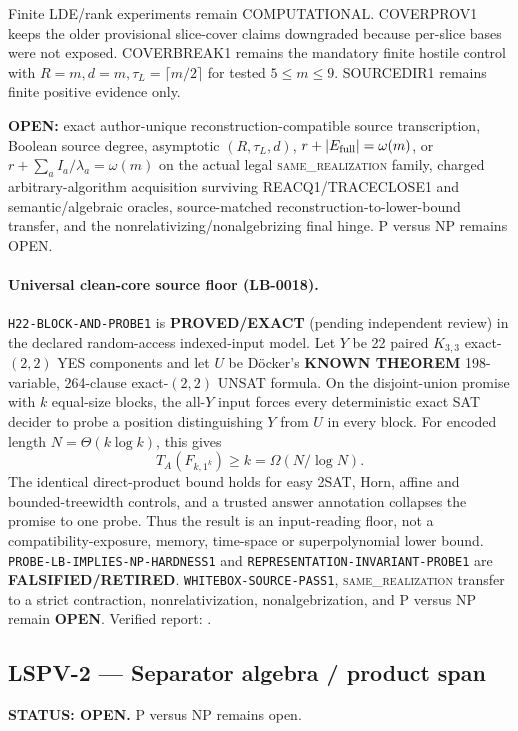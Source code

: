 \documentclass[11pt]{article}
\begin{document}
Finite LDE/rank experiments remain COMPUTATIONAL. COVERPROV1 keeps the older provisional
slice-cover claims downgraded because per-slice bases were not exposed. COVERBREAK1 remains the
mandatory finite hostile control with \(R=m,d=m,\tau_L=\lceil m/2\rceil\) for tested \(5\le m\le9\).
SOURCEDIR1 remains finite positive evidence only.

\textbf{OPEN:} exact author-unique reconstruction-compatible source transcription, Boolean source
degree, asymptotic \((R,\tau_L,d)\), \(r+|E_{\rm full}|=\omega(m)\), or \(r+\sum_a I_a/\lambda_a=\omega(m)\) on the actual legal
\textsc{same\_realization} family, charged arbitrary-algorithm acquisition surviving
REACQ1/TRACECLOSE1 and semantic/algebraic oracles, source-matched reconstruction-to-lower-bound
transfer, and the nonrelativizing/nonalgebrizing final hinge. P versus NP remains OPEN.

\paragraph{Universal clean-core source floor (LB-0018).}
\texttt{H22-BLOCK-AND-PROBE1} is \textbf{PROVED/EXACT} (pending independent
review) in the declared random-access indexed-input model.  Let \(Y\) be 22
paired \(K_{3,3}\) exact-\((2,2)\) YES components and let \(U\) be
D\"ocker's \textbf{KNOWN THEOREM} 198-variable, 264-clause exact-\((2,2)\)
UNSAT formula.  On the disjoint-union promise with \(k\) equal-size blocks,
the all-\(Y\) input forces every deterministic exact SAT decider to probe a
position distinguishing \(Y\) from \(U\) in every block.  For encoded length
\(N=\Theta(k\log k)\), this gives
\[
 T_A(F_{k,1^k})\ge k=\Omega(N/\log N).
\]
The identical direct-product bound holds for easy 2SAT, Horn, affine and
bounded-treewidth controls, and a trusted answer annotation collapses the
promise to one probe.  Thus the result is an input-reading floor, not a
compatibility-exposure, memory, time-space or superpolynomial lower bound.
\texttt{PROBE-LB-IMPLIES-NP-HARDNESS1} and
\texttt{REPRESENTATION-INVARIANT-PROBE1} are
\textbf{FALSIFIED/RETIRED}.  \texttt{WHITEBOX-SOURCE-PASS1},
\textsc{same\_realization} transfer to a strict contraction,
nonrelativization, nonalgebrization, and P versus NP remain \textbf{OPEN}.
Verified report:
.

\subsection{LSPV-2 --- Separator algebra / product span}
\textbf{STATUS: OPEN.} P versus NP remains open.
\end{document}
